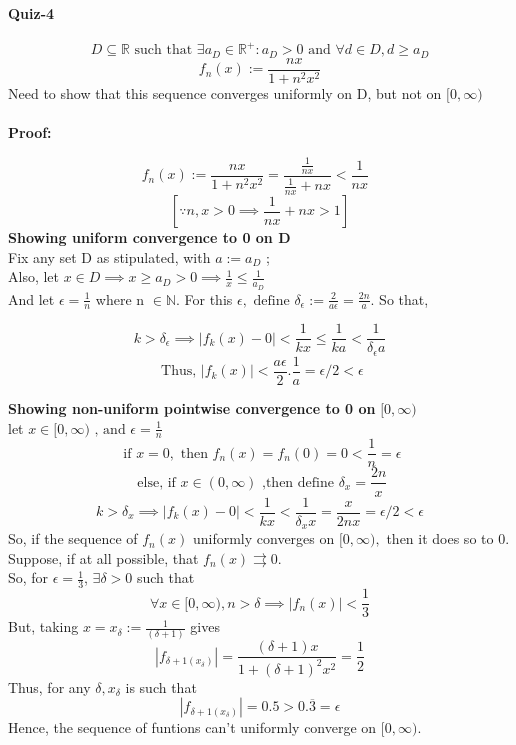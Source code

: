 \documentclass[20pt]{extarticle} %
\begin{document}
\paragraph{Quiz-4}

\[D \subseteq \mathbb{R} \text{ such that } \exists a_D \in \mathbb{R^+}: a_D >0 \text{ and }  \forall d \in D, d \geq a_D    \]
\[  f_n(x):= \frac{nx}{1+n^2x^2}   \]
Need to show that this sequence converges uniformly on D, but not on $[0,\infty)$\\\\
\textbf{Proof:}

	\[  f_n(x):= \frac{nx}{1+n^2x^2}= \frac {\frac{1}{nx}}{ \frac{1}{nx}+nx}< \frac{1}{nx} \text{   } \]
	\[ [    \because n,x>0 \implies \frac{1}{nx}+nx>1 ] \]
\textbf{Showing uniform convergence to 0 on D}\\
	Fix any set D as stipulated, with $a:=a_D$ ;
	\\Also, let $x \in D \implies x \geq a_D >0 \implies \frac{1}{x} \leq \frac{1}{a_D}  $ \\
	And let $\epsilon = \frac{1}{n}$ where n $\in \mathbb{N}$.
	For this $\epsilon, \text{ define }  \delta_\epsilon:= \frac{2}{a\epsilon} = \frac{2n}{a} $. So that,

	\[ k> \delta_\epsilon \implies |f_k(x)-0|< \frac{1}{kx} \leq \frac{1}{ka}  < \frac{1}{\delta_\epsilon a}\]
	\[ \text{ Thus, } |f_k(x)|< \frac{a\epsilon}{2} . \frac{1}{a}=\epsilon/2<\epsilon \]
\newpage

\textbf{Showing non-uniform pointwise convergence to 0 on }$[0,\infty)$\\
let $x\in[ 0,\infty) \text{ , and } \epsilon= \frac{1}{n}$ \\
	\[ \text{ if } x=0, \text{ then } f_n(x)=f_n(0)=0< \frac{1}{n}=\epsilon  \]
\[\text{ else, if }x \in (0,\infty) \text{ ,then define }\delta_x= \frac{2n}{x} \]
\[ k> \delta_x \implies |f_k(x)-0|< \frac{1}{kx}  < \frac{1}{\delta_x x}= \frac{x}{2nx}=\epsilon/2< \epsilon \]
So, if the sequence of $f_n(x)$ uniformly converges on $[0,\infty),$ then it does so to 0. Suppose, if at all possible, that $f_n(x) \rightrightarrows 0$.\\
So, for $\epsilon= \frac{1}{3} $, $\exists \delta>0$ such that
\[ \forall x \in[0,\infty), n>\delta \implies |f_n(x)|< \frac{1}{3} \]
But, taking $x = x_\delta := \frac{1}{(\delta+1)} $ gives
\[|f_{\delta+1(x_\delta)}|= \frac{(\delta+1)x}{1+(\delta +1)^2x^2}= \frac{1}{2} \]%
Thus, for any $\delta, x_\delta$ is such that
\[ |f_{\delta+1(x_\delta)}|= 0.5 > 0.\overline{3} = \epsilon \]
Hence, the sequence of funtions can't uniformly converge on $[0,\infty)$.
\end{document}
